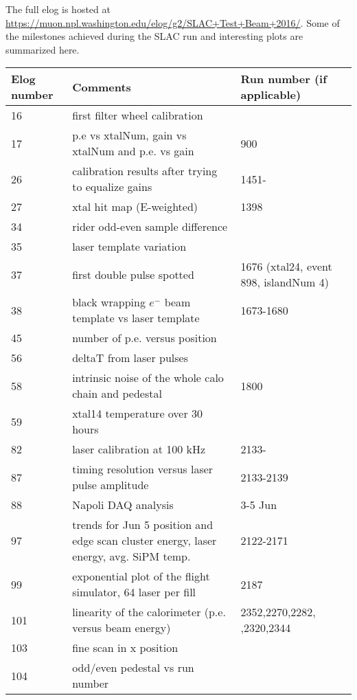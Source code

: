 The full elog is hosted at \url{https://muon.npl.washington.edu/elog/g2/SLAC+Test+Beam+2016/}.
Some of the milestones achieved during the SLAC run and interesting plots are summarized here.

\begin{longtable}{|p{2.5cm}|p{8cm}|p{4cm}|} \hline
Elog number &  Comments & Run number \newline (if applicable)\\ \hline
16 & first filter wheel calibration & \\ \hline
17 & p.e vs xtalNum, gain vs xtalNum and p.e. vs gain & 900 \\ \hline
26 & calibration results after trying to equalize gains & 1451- \\ \hline
27 & xtal hit map (E-weighted) & 1398 \\ \hline
34 & rider odd-even sample difference & \\ \hline
35 & laser template variation & \\ \hline
37 & first double pulse spotted & 1676 (xtal24, event 898, islandNum 4) \\ \hline
38 & black wrapping $e^{-}$ beam template vs laser template & 1673-1680 \\ \hline
45 & number of p.e. versus position & \\ \hline
56 & deltaT from laser pulses & \\ \hline
58 & intrinsic noise of the whole calo chain and pedestal & 1800 \\ \hline
59 & xtal14 temperature over 30 hours & \\ \hline
82 & laser calibration at 100 kHz & 2133- \\ \hline
87 & timing resolution versus laser pulse amplitude & 2133-2139 \\ \hline
88 & Napoli DAQ analysis & 3-5 Jun \\ \hline
97 & trends for Jun 5 position and edge scan \newline cluster energy, laser energy, avg. SiPM temp. & 2122-2171 \\ \hline
99 & exponential plot of the flight simulator, 64 laser per fill & 2187 \\ \hline
101 & linearity of the calorimeter (p.e. versus beam energy) & 2352,2270,2282, \newline 2308,2320,2344 \\ \hline
103 & fine scan in x position & \\ \hline
104 & odd/even pedestal vs run number & \\ \hline

\end{longtable}
